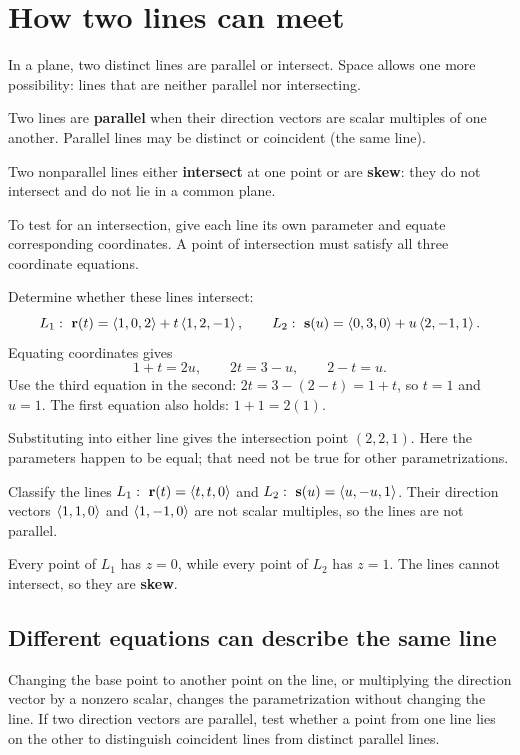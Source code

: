 \documentclass[11pt]{article}
\begin{document}
\newpage
\section{How two lines can meet}
In a plane, two distinct lines are parallel or intersect. Space allows
one more possibility: lines that are neither parallel nor intersecting.

\begin{definition}
Two lines are \textbf{parallel} when their direction vectors are scalar
multiples of one another. Parallel lines may be distinct or coincident
(the same line).

Two nonparallel lines either \textbf{intersect} at one point or are
\textbf{skew}: they do not intersect and do not lie in a common plane.
\end{definition}

To test for an intersection, give each line its own parameter and equate
corresponding coordinates. A point of intersection must satisfy all three
coordinate equations.

\begin{example}{Determine whether these lines intersect:
\[
 L_1:\ \mathbf{r}(t)=\left\langle 1,0,2\right\rangle+t\left\langle 1,2,-1\right\rangle,\qquad
 L_2:\ \mathbf{s}(u)=\left\langle 0,3,0\right\rangle+u\left\langle 2,-1,1\right\rangle.
\]}
Equating coordinates gives
\[
 1+t=2u,\qquad 2t=3-u,\qquad 2-t=u.
\]
Use the third equation in the second:
$2t=3-(2-t)=1+t$, so $t=1$ and $u=1$.
The first equation also holds: $1+1=2(1)$.

Substituting into either line gives the intersection point
$\boxed{(2,2,1)}$. Here the parameters happen to be equal; that need not
be true for other parametrizations.
\end{example}

\begin{example}{Classify the lines
$L_1:\ \B{r}(t)=\cvec{t,t,0}$ and
$L_2:\ \B{s}(u)=\cvec{u,-u,1}$.}
Their direction vectors $\left\langle 1,1,0\right\rangle$ and $\left\langle 1,-1,0\right\rangle$ are not scalar
multiples, so the lines are not parallel.

Every point of $L_1$ has $z=0$, while every point of $L_2$ has $z=1$.
The lines cannot intersect, so they are \textbf{skew}.
\end{example}

\subsection{Different equations can describe the same line}
Changing the base point to another point on the line, or multiplying the
direction vector by a nonzero scalar, changes the parametrization without
changing the line. If two direction vectors are parallel, test whether a
point from one line lies on the other to distinguish coincident lines
from distinct parallel lines.
\end{document}
